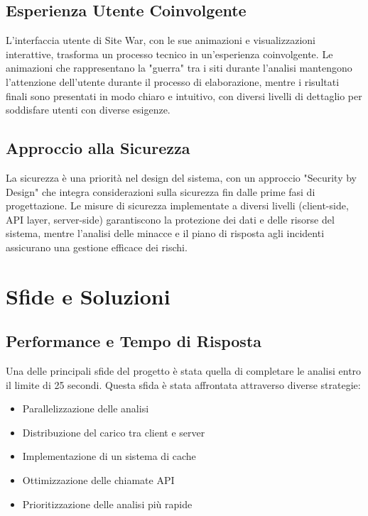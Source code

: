 \subsection{Esperienza Utente Coinvolgente}
L'interfaccia utente di Site War, con le sue animazioni e visualizzazioni interattive, trasforma un processo tecnico in un'esperienza coinvolgente. Le animazioni che rappresentano la "guerra" tra i siti durante l'analisi mantengono l'attenzione dell'utente durante il processo di elaborazione, mentre i risultati finali sono presentati in modo chiaro e intuitivo, con diversi livelli di dettaglio per soddisfare utenti con diverse esigenze.

\subsection{Approccio alla Sicurezza}
La sicurezza è una priorità nel design del sistema, con un approccio "Security by Design" che integra considerazioni sulla sicurezza fin dalle prime fasi di progettazione. Le misure di sicurezza implementate a diversi livelli (client-side, API layer, server-side) garantiscono la protezione dei dati e delle risorse del sistema, mentre l'analisi delle minacce e il piano di risposta agli incidenti assicurano una gestione efficace dei rischi.

\section{Sfide e Soluzioni}

\subsection{Performance e Tempo di Risposta}
Una delle principali sfide del progetto è stata quella di completare le analisi entro il limite di 25 secondi. Questa sfida è stata affrontata attraverso diverse strategie:

\begin{itemize}
    \item Parallelizzazione delle analisi
    \item Distribuzione del carico tra client e server
    \item Implementazione di un sistema di cache
    \item Ottimizzazione delle chiamate API
    \item Prioritizzazione delle analisi più rapide
\end{itemize}

